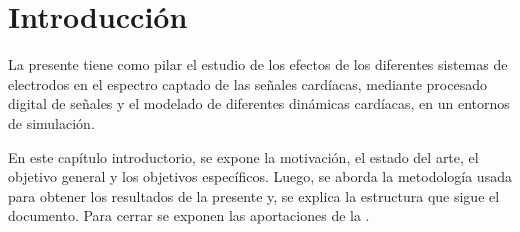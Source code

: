 
\chapter{Introducción}

\begin{resumen}
La presente \nombreDoc tiene como pilar el estudio de los efectos de los diferentes sistemas de electrodos en el espectro captado de las señales cardíacas, mediante procesado digital de señales y el modelado de diferentes dinámicas cardíacas, en un entornos de simulación.

En este capítulo introductorio, se expone la motivación, el estado del arte, el objetivo general y los objetivos específicos. Luego, se aborda la metodología usada para obtener los resultados de la presente \nombreDoc y, se explica la estructura que sigue el documento. Para cerrar se exponen las aportaciones de la \nombreDoc.



\end{resumen}


\medskip %





